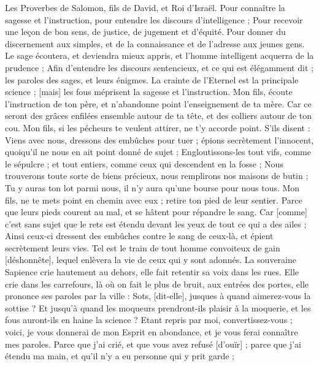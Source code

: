 \BFont
\begin{multicols}{2}
\VerseOne{}Les Proverbes de Salomon, fils de David, et Roi d'Israël.
Pour connaître la sagesse et l'instruction, pour entendre les discours d'intelligence ;
Pour recevoir une leçon de bon sens, de justice, de jugement et d'équité.
Pour donner du discernement aux simples, et de la connaissance et de l'adresse aux jeunes gens.
Le sage écoutera, et deviendra mieux appris, et l'homme intelligent acquerra de la prudence ;
Afin d'entendre les discours sentencieux, et ce qui est élégamment dit ; les paroles des sages, et leurs énigmes.
La crainte de l'Eternel est la principale science ; [mais] les fous méprisent la sagesse et l'instruction.
Mon fils, écoute l'instruction de ton père, et n'abandonne point l'enseignement de ta mère.
Car ce seront des grâces enfilées ensemble autour de ta tête, et des colliers autour de ton cou.
Mon fils, si les pécheurs te veulent attirer, ne t'y accorde point.
S'ils disent : Viens avec nous, dressons des embûches pour tuer ; épions secrètement l'innocent, quoiqu'il ne nous en ait point donné de sujet ;
Engloutissons-les tout vifs, comme le sépulcre ; et tout entiers, comme ceux qui descendent en la fosse ;
Nous trouverons toute sorte de biens précieux, nous remplirons nos maisons de butin ;
Tu y auras ton lot parmi nous, il n'y aura qu'une bourse pour nous tous.
Mon fils, ne te mets point en chemin avec eux ; retire ton pied de leur sentier.
Parce que leurs pieds courent au mal, et se hâtent pour répandre le sang.
Car [comme] c'est sans sujet que le rets est étendu devant les yeux de tout ce qui a des ailes ;
Ainsi ceux-ci dressent des embûches contre le sang de ceux-là, et épient secrètement leurs vies.
Tel est le train de tout homme convoiteux de gain [déshonnête], lequel enlèvera la vie de ceux qui y sont adonnés.
La souveraine Sapience crie hautement au dehors, elle fait retentir sa voix dans les rues.
Elle crie dans les carrefours, là où on fait le plus de bruit, aux entrées des portes, elle prononce ses paroles par la ville :
Sots, [dit-elle], jusques à quand aimerez-vous la sottise ? Et jusqu'à quand les moqueurs prendront-ils plaisir à la moquerie, et les fous auront-ils en haine la science ?
Etant repris par moi, convertissez-vous ; voici, je vous donnerai de mon Esprit en abondance, et je vous ferai connaître mes paroles.
Parce que j'ai crié, et que vous avez refusé [d'ouïr] ; parce que j'ai étendu ma main, et qu'il n'y a eu personne qui y prit garde ;

\end{multicols}
